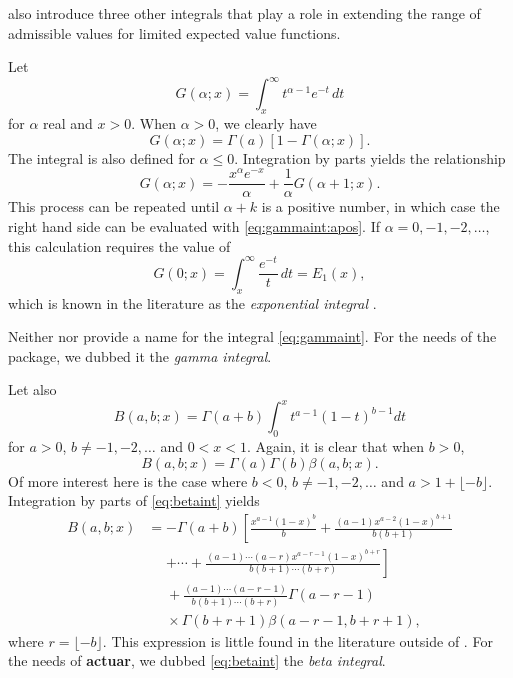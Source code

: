 \documentclass[x11names]{article}
\newcommand{\pkg}[1]{\textbf{#1}}
\begin{document}
\citet{LossModels4e} also introduce three other integrals that play a
role in extending the range of admissible values for limited expected
value functions.

Let
\begin{equation}
  \label{eq:gammaint}
  G(\alpha; x) = \int_x^\infty t^{\alpha - 1} e^{-t}\, dt
\end{equation}
for $\alpha$ real and $x > 0$. When $\alpha > 0$, we clearly have
\begin{equation}
  \label{eq:gammaint:apos}
  G(\alpha; x) = \Gamma(a) [1 - \Gamma(\alpha; x)].
\end{equation}
The integral is also defined for $\alpha \le 0$. Integration by parts
yields the relationship
\begin{equation*}
  G(\alpha; x) = -\frac{x^\alpha e^{-x}}{\alpha}
  + \frac{1}{\alpha} G(\alpha + 1; x).
\end{equation*}
This process can be repeated until $\alpha + k$ is a positive number,
in which case the right hand side can be evaluated with
\eqref{eq:gammaint:apos}. If $\alpha = 0, -1, -2, \dots$, this
calculation requires the value of
\begin{equation*}
  \label{eq:expint}
  G(0; x) = \int_x^\infty \frac{e^{-t}}{t}\, dt = E_1(x),
\end{equation*}
which is known in the literature as the \emph{exponential integral}
\citep{Abramowitz:1972}.

Neither \citet{LossModels4e} nor \citet{Abramowitz:1972} provide a
name for the integral \eqref{eq:gammaint}. For the needs of the
package, we dubbed it the \emph{gamma integral}.

Let also
\begin{equation}
  \label{eq:betaint}
  B(a, b; x) = \Gamma(a + b) \int_0^x t^{a-1} (1-t)^{b-1} dt
\end{equation}
for $a > 0$, $b \neq -1, -2, \dots$ and $0 < x < 1$. Again, it is
clear that when $b > 0$,
\begin{equation*}
  B(a, b; x) = \Gamma(a) \Gamma(b) \beta(a, b; x).
\end{equation*}
Of more interest here is the case where $b < 0$,
$b \neq -1, -2, \dots$ and $a > 1 + \lfloor -b\rfloor$. Integration by
parts of \eqref{eq:betaint} yields
\begin{equation*}
  \begin{split}
    B(a, b; x)
    &= \displaystyle
    -\Gamma(a + b) \left[ \frac{x^{a-1} (1-x)^b}{b}
      + \frac{(a-1) x^{a-2} (1-x)^{b+1}}{b (b+1)} \right. \\
    &\phantom{=} \displaystyle\left.
      + \cdots + \frac{(a-1) \cdots (a-r) x^{a-r-1}
        (1-x)^{b+r}}{b (b+1) \cdots (b+r)} \right] \\
    &\phantom{=} \displaystyle
    + \frac{(a-1) \cdots (a-r-1)}{b (b+1) \cdots (b+r)}
    \Gamma(a-r-1) \\
    &\phantom{=} \times \Gamma(b+r+1) \beta(a-r-1, b+r+1),
  \end{split}
\end{equation*}
where $r = \lfloor -b\rfloor$. This expression is little found in the
literature outside of \citet{LossModels4e}. For the needs of
\pkg{actuar}, we dubbed \eqref{eq:betaint} the \emph{beta
  integral}.
\end{document}
